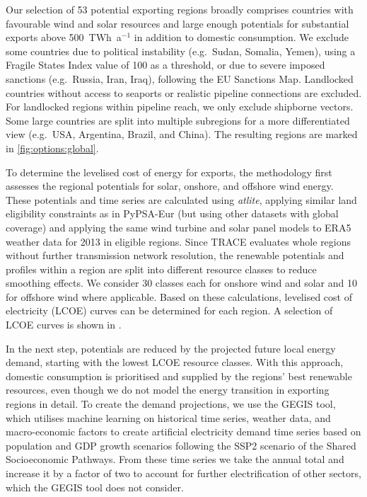 Our selection of 53 potential exporting regions broadly comprises countries with
favourable wind and solar resources and large enough potentials for substantial
exports above 500~TWh~a$^{-1}$ in addition to domestic consumption. We exclude
some countries due to political instability (e.g.~Sudan, Somalia, Yemen), using
a Fragile States Index\cite{thefundforpeaceffpFragileStatesIndex2023} value of
100 as a threshold, or due to severe imposed sanctions (e.g.~Russia, Iran,
Iraq), following the EU Sanctions
Map.\cite{estonianpresidencyofthecounciloftheeuEUSanctionsMap2024} Landlocked
countries without access to seaports or realistic pipeline connections are
excluded. For landlocked regions within pipeline reach, we only exclude
shipborne vectors. Some large countries are split into multiple subregions for
a more differentiated view (e.g.~USA, Argentina, Brazil, and China). The
resulting regions are marked in \cref{fig:options:global}.


To determine the levelised cost of energy for exports, the methodology first
assesses the regional potentials for solar, onshore, and offshore wind energy.
These potentials and time series are calculated using
\textit{atlite},\cite{hofmannAtliteLightweight2021} applying similar land
eligibility constraints as in PyPSA-Eur (but using other datasets with global
coverage) and applying the same wind turbine and solar panel models to
ERA5\cite{ecmwf} weather data for 2013 in eligible regions. Since TRACE
evaluates whole regions without further transmission network resolution, the
renewable potentials and profiles within a region are split into different
resource classes to reduce smoothing effects. We consider 30 classes each for
onshore wind and solar and 10 for offshore wind where applicable. Based on these
calculations, levelised cost of electricity (LCOE) curves can be determined for
each region. A selection of LCOE curves is shown in
.


In the next step, potentials are reduced by the projected future local energy
demand, starting with the lowest LCOE resource classes. With this approach,
domestic consumption is prioritised and supplied by the regions' best renewable
resources, even though we do not model the energy transition in exporting
regions in detail. To create the demand projections, we use the
GEGIS\cite{mattssonAutopilotEnergyModels2021} tool, which utilises machine
learning on historical time series, weather data, and macro-economic factors to
create artificial electricity demand time series based on population and GDP
growth scenarios following the SSP2 scenario of the Shared Socioeconomic
Pathways.\cite{riahiSharedSocioeconomicPathways2017} From these time series we
take the annual total and increase it by a factor of two to account for further
electrification of other sectors, which the GEGIS tool does not consider.

